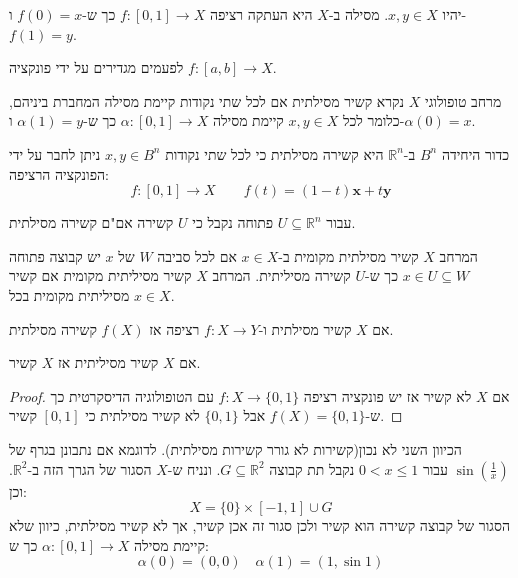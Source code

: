 \documentclass{tstextbook}
\begin{document}
\begin{definition}[מסילה]
יהיו \(x,y\in X\). מסילה ב-\(X\) היא העתקה רציפה \(f:[0,1]\to X\) כך ש-\(f(0)=x\) ו-\(f(1)=y\).

\end{definition}
\begin{remark}
לפעמים מגדירים על ידי פונקציה \(f:[a,b]\to X\).

\end{remark}
\begin{definition}
מרחב טופולוגי \(X\) נקרא קשיר מסילתית אם לכל שתי נקודות קיימת מסילה המחברת ביניהם, כלומר לכל \(x,y \in X\) קיימת מסילה \(\alpha:[0,1]\to X\) כך ש-\(\alpha(1)=y\) ו-\(\alpha(0)=x\).

\end{definition}
\begin{example}
כדור היחידה \(B^{n}\) ב-\(\mathbb{R}^{n}\) היא קשירה מסילתית כי לכל שתי נקודות \(x,y \in B^{n}\) ניתן לחבר על ידי הפונקציה הרציפה:
$$f:[0,1]\to X\qquad f(t)=(1-t)\mathbf{x}+t\mathbf{y}$$

\end{example}
\begin{proposition}
עבור \(U\subseteq \mathbb{R}^{n}\) פתוחה נקבל כי \(U\) קשירה אם"ם קשירה מסילתית.

\end{proposition}
\begin{definition}
המרחב \(X\) קשיר מסילתית מקומית ב-\(x \in X\) אם לכל סביבה \(W\) של \(x\) יש קבוצה פתוחה \(x \in U\subseteq W\) כך ש-\(U\) קשירה מסיליתית. המרחב \(X\) קשיר מסיליתית מקומית אם קשיר מסיליתית מקומית בכל \(x \in X\).

\end{definition}
\begin{proposition}
אם \(X\) קשיר מסילתית ו-\(f:X\to Y\) רציפה אז \(f(X)\) קשירה מסילתית.

\end{proposition}
\begin{proposition}
אם \(X\) קשיר מסיליתית אז \(X\) קשיר.

\end{proposition}
\begin{proof}
אם \(X\) לא קשיר אז יש פונקציה רציפה \(f:X\to \{ 0,1 \}\) עם הטופולוגיה הדיסקרטית כך ש-\(f(X)=\{ 0,1 \}\) אבל \(\{ 0,1 \}\) לא קשיר מסילתית כי \([0,1]\) קשיר.

\end{proof}
\begin{remark}
הכיוון השני לא נכון(קשירות לא גורר קשירות מסילתית). לדוגמא אם נתבונן בגרף של \(\sin\left( \frac{1}{x} \right)\) עבור \(0<x\leq 1\) נקבל תת קבוצה \(G\subseteq \mathbb{R}^{2}\). ונניח ש-\(X\) הסגור של הגרך הזה ב-\(\mathbb{R}^{2}\). וכן:
$$X=\{ 0 \}\times[-1,1]\cup  G$$
הסגור של קבוצה קשירה הוא קשיר ולכן סגור זה אכן קשיר, אך לא קשיר מסילתית, כיוון שלא קיימת מסילה \(\alpha:[0,1]\to X\) כך ש:
$$\alpha(0)=(0,0)\quad \alpha(1)=(1,\sin 1)$$

\end{remark}
\end{document}
